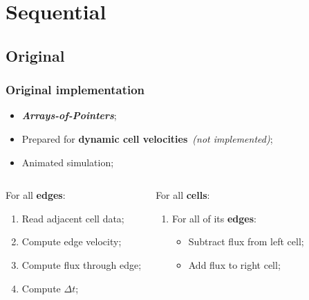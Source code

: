 \section{Sequential}


\subsection{Original}
\begin{frame}
	\frametitle{Original implementation}
	\begin{itemize}
		\item \textbf{\itshape Arrays-of-Pointers};
		\item Prepared for \textbf{dynamic cell velocities}\ \textit{(not implemented)};
		\item Animated simulation;
	\end{itemize}

	\begin{columns}
		\begin{block}{\computeflux}
			\smaller
			For all \textbf{edges}:
			\begin{enumerate}
				\item Read adjacent cell data;	
				\item Compute edge velocity;
				\item Compute flux through edge;
				\item Compute $\Delta t$;
			\end{enumerate}
		\end{block}

		\begin{block}{\update}
			\smaller
			For all \textbf{cells}:
			\begin{enumerate}
				\item For all of its \textbf{edges}:
				\begin{itemize}\smaller
					\item Subtract flux from left cell;
					\item Add flux to right cell;
				\end{itemize}
			\end{enumerate}
		\end{block}
	\end{columns}
\end{frame}

